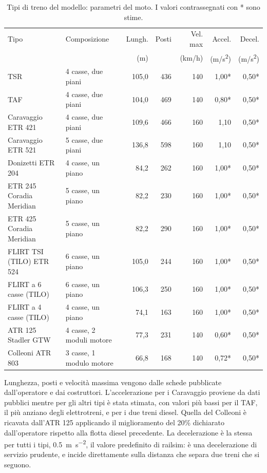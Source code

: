 \begin{table}[H]
	\centering
	\caption{Tipi di treno del modello: parametri del moto. I valori contrassegnati con * sono stime.}
	\label{tab:rotabile-moto}
	\small
	\begin{tabularx}{\textwidth}{Xlrrrrr}
		\toprule
		Tipo & Composizione & Lungh. & Posti & Vel. max & Accel. & Decel. \\
		 & & (m) & & (km/h) & (m/s\textsuperscript{2}) & (m/s\textsuperscript{2}) \\
		\midrule
		TSR & 4 casse, due piani & 105,0 & 436 & 140 & 1,00* & 0,50* \\
		TAF & 4 casse, due piani & 104,0 & 469 & 140 & 0,80* & 0,50* \\
		Caravaggio ETR 421 & 4 casse, due piani & 109,6 & 466 & 160 & 1,10 & 0,50* \\
		Caravaggio ETR 521 & 5 casse, due piani & 136,8 & 598 & 160 & 1,10 & 0,50* \\
		Donizetti ETR 204 & 4 casse, un piano & 84,2 & 262 & 160 & 1,00* & 0,50* \\
		ETR 245 Coradia Meridian & 5 casse, un piano & 82,2 & 230 & 160 & 1,00* & 0,50* \\
		ETR 425 Coradia Meridian & 5 casse, un piano & 82,2 & 290 & 160 & 1,00* & 0,50* \\
		FLIRT TSI (TILO) ETR 524 & 6 casse, un piano & 105,0 & 244 & 160 & 1,00* & 0,50* \\
		FLIRT a 6 casse (TILO) & 6 casse, un piano & 106,3 & 250 & 160 & 1,00* & 0,50* \\
		FLIRT a 4 casse (TILO) & 4 casse, un piano & 74,1 & 163 & 160 & 1,00* & 0,50* \\
		ATR 125 Stadler GTW & 4 casse, 2 moduli motore & 77,3 & 231 & 140 & 0,60* & 0,50* \\
		Colleoni ATR 803 & 3 casse, 1 modulo motore & 66,8 & 168 & 140 & 0,72* & 0,50* \\
		\bottomrule
	\end{tabularx}
\end{table}

Lunghezza, posti e velocità massima vengono dalle schede pubblicate dall'operatore e dai costruttori. L'accelerazione per i Caravaggio proviene da dati pubblici mentre per gli altri tipi è stata stimata, con valori più bassi per il TAF, il più anziano degli elettrotreni, e per i due treni diesel. Quella del Colleoni è ricavata dall'ATR 125 applicando il miglioramento del 20\% dichiarato dall'operatore rispetto alla flotta diesel precedente. La decelerazione è la stessa per tutti i tipi, \SI{0,5}{\metre\per\second\squared}, il valore predefinito di railsim: è una decelerazione di servizio prudente, e incide direttamente sulla distanza che separa due treni che si seguono.

